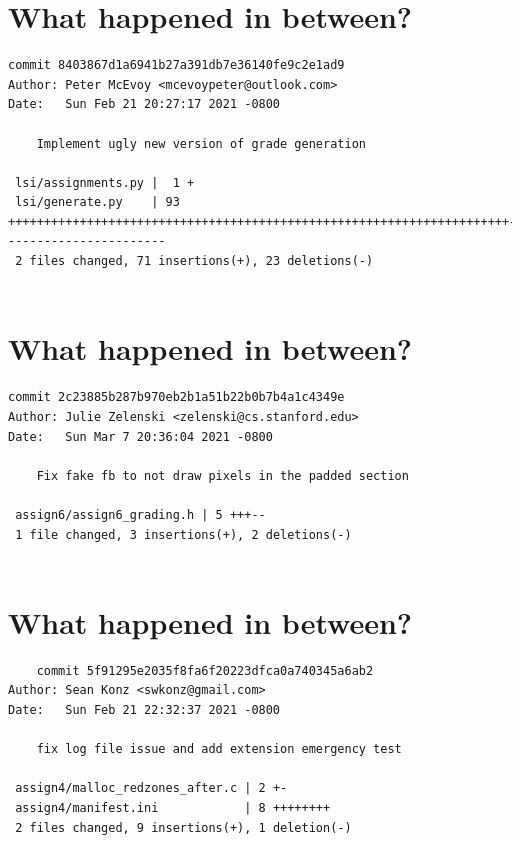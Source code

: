 \documentclass{article}
\begin{document}
\newpage

\section*{What happened in between?}
\vspace{2ex}
\begin{verbatim}
commit 8403867d1a6941b27a391db7e36140fe9c2e1ad9
Author: Peter McEvoy <mcevoypeter@outlook.com>
Date:   Sun Feb 21 20:27:17 2021 -0800

    Implement ugly new version of grade generation

 lsi/assignments.py |  1 +
 lsi/generate.py    | 93 ++++++++++++++++++++++++++++++++++++++++++++++++++++++++++++++++++++++-----------------------
 2 files changed, 71 insertions(+), 23 deletions(-)


\end{verbatim}

\newpage

\section*{What happened in between?}
\vspace{2ex}
\begin{verbatim}
commit 2c23885b287b970eb2b1a51b22b0b7b4a1c4349e
Author: Julie Zelenski <zelenski@cs.stanford.edu>
Date:   Sun Mar 7 20:36:04 2021 -0800

    Fix fake fb to not draw pixels in the padded section

 assign6/assign6_grading.h | 5 +++--
 1 file changed, 3 insertions(+), 2 deletions(-)


\end{verbatim}

\newpage


\section*{What happened in between?}
\vspace{2ex}
\begin{verbatim}
    commit 5f91295e2035f8fa6f20223dfca0a740345a6ab2
Author: Sean Konz <swkonz@gmail.com>
Date:   Sun Feb 21 22:32:37 2021 -0800

    fix log file issue and add extension emergency test

 assign4/malloc_redzones_after.c | 2 +-
 assign4/manifest.ini            | 8 ++++++++
 2 files changed, 9 insertions(+), 1 deletion(-)


\end{verbatim}
\end{document}
